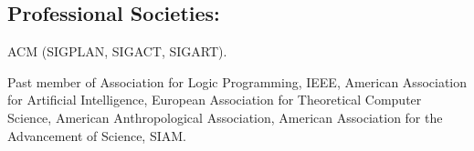 \documentclass{article}
\begin{document}
\subsection*{Professional Societies:}


ACM (SIGPLAN, SIGACT, SIGART). 

Past member of Association for Logic Programming, IEEE, American
Association for Artificial Intelligence, European Association for
Theoretical Computer Science, American Anthropological Association,
American Association for the Advancement of Science, SIAM.
\end{document}
